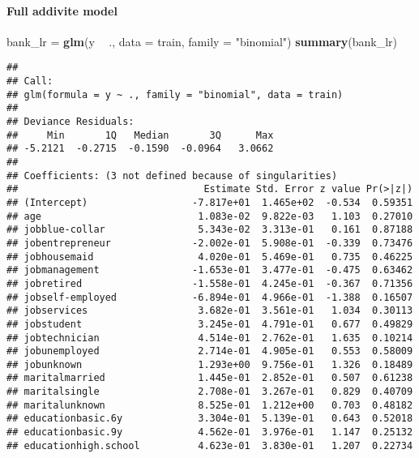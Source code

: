 \documentclass[
]{article}
\newenvironment{Shaded}{\begin{snugshade}}{\end{snugshade}}
\newcommand{\DataTypeTok}[1]{\textcolor[rgb]{0.13,0.29,0.53}{#1}}
\newcommand{\KeywordTok}[1]{\textcolor[rgb]{0.13,0.29,0.53}{\textbf{#1}}}
\newcommand{\NormalTok}[1]{#1}
\newcommand{\OperatorTok}[1]{\textcolor[rgb]{0.81,0.36,0.00}{\textbf{#1}}}
\newcommand{\StringTok}[1]{\textcolor[rgb]{0.31,0.60,0.02}{#1}}
\begin{document}
\hypertarget{full-addivite-model}{%
\paragraph{Full addivite model}\label{full-addivite-model}}

\begin{Shaded}
\begin{Highlighting}[]
\NormalTok{bank_lr =}\StringTok{ }\KeywordTok{glm}\NormalTok{(y }\OperatorTok{~}\StringTok{ }\NormalTok{., }\DataTypeTok{data =}\NormalTok{ train, }\DataTypeTok{family =} \StringTok{"binomial"}\NormalTok{)}
\KeywordTok{summary}\NormalTok{(bank_lr)}
\end{Highlighting}
\end{Shaded}

\begin{verbatim}
## 
## Call:
## glm(formula = y ~ ., family = "binomial", data = train)
## 
## Deviance Residuals: 
##     Min       1Q   Median       3Q      Max  
## -5.2121  -0.2715  -0.1590  -0.0964   3.0662  
## 
## Coefficients: (3 not defined because of singularities)
##                                Estimate Std. Error z value Pr(>|z|)    
## (Intercept)                  -7.817e+01  1.465e+02  -0.534  0.59351    
## age                           1.083e-02  9.822e-03   1.103  0.27010    
## jobblue-collar                5.343e-02  3.313e-01   0.161  0.87188    
## jobentrepreneur              -2.002e-01  5.908e-01  -0.339  0.73476    
## jobhousemaid                  4.020e-01  5.469e-01   0.735  0.46225    
## jobmanagement                -1.653e-01  3.477e-01  -0.475  0.63462    
## jobretired                   -1.558e-01  4.245e-01  -0.367  0.71356    
## jobself-employed             -6.894e-01  4.966e-01  -1.388  0.16507    
## jobservices                   3.682e-01  3.561e-01   1.034  0.30113    
## jobstudent                    3.245e-01  4.791e-01   0.677  0.49829    
## jobtechnician                 4.514e-01  2.762e-01   1.635  0.10214    
## jobunemployed                 2.714e-01  4.905e-01   0.553  0.58009    
## jobunknown                    1.293e+00  9.756e-01   1.326  0.18489    
## maritalmarried                1.445e-01  2.852e-01   0.507  0.61238    
## maritalsingle                 2.708e-01  3.267e-01   0.829  0.40709    
## maritalunknown                8.525e-01  1.212e+00   0.703  0.48182    
## educationbasic.6y             3.304e-01  5.139e-01   0.643  0.52018    
## educationbasic.9y             4.562e-01  3.976e-01   1.147  0.25132    
## educationhigh.school          4.623e-01  3.830e-01   1.207  0.22734    

\end{verbatim}
\end{document}
